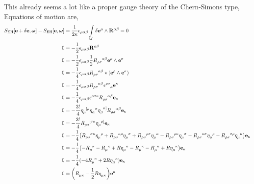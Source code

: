 This already seems a lot like a proper gauge theory of the Chern-Simons type,
Equations of motion are,
\begin{align*}
    S_{\textnormal{EH}}\qty[\vb e+\delta\vb e,\boldsymbol\omega]-S_{\textnormal{EH}}\qty[\vb e,\boldsymbol\omega]&=\frac{1}{2\kappa}\epsilon_{\mu\alpha\beta}\int\limits_M\delta\vb e^{\mu}\wedge\vb R^{\alpha\beta}=0\\
    0&=-\frac12\epsilon_{\mu\alpha\beta}\vb R^{\alpha\beta}\\
    0&=-\frac12\epsilon_{\mu\alpha\beta}\frac12\tensor{R}{_\rho_\sigma^\alpha^\beta}\vb e^\rho\wedge\vb e^\sigma\\
    0&=-\frac14\epsilon_{\mu\alpha\beta}\tensor{R}{_\rho_\sigma^\alpha^\beta}\star\qty(\vb e^\rho\wedge\vb e^\sigma)\\
    0&=-\frac14\epsilon_{\mu\alpha\beta}\tensor{R}{_\rho_\sigma^\alpha^\beta}\tensor{\epsilon}{^\rho^\sigma_\kappa}\vb e^\kappa\\
    0&=-\frac14\epsilon_{\mu\alpha\beta}\tensor{\epsilon}{^\rho^\sigma^\kappa}\tensor{R}{_\rho_\sigma^\alpha^\beta}\vb e_\kappa\\
    0&=-\frac{3!}{4}\tensor{\eta}{_\mu^{[\rho}}\tensor{\eta}{_\alpha^{\sigma}}\tensor{\eta}{_\beta^{\kappa]}}\tensor{R}{_\rho_\sigma^\alpha^\beta}\vb e_\kappa\\
    0&=-\frac{3!}{4}\tensor{R}{_\rho_\sigma^{[\sigma}^\kappa}\tensor{\eta}{_\mu^{\rho]}}\vb e_\kappa\\
    0&=-\frac14\qty(\tensor{R}{_\rho_\sigma^{\sigma}^\kappa}\tensor{\eta}{_\mu^{\rho}}+\tensor{R}{_\rho_\sigma^\kappa^\rho}\tensor{\eta}{_\mu^{\sigma}}+\tensor{R}{_\rho_\sigma^\rho^\sigma}\tensor{\eta}{_\mu^\kappa}-\tensor{R}{_\rho_\sigma^{\rho}^\kappa}\tensor{\eta}{_\mu^{\sigma}}-\tensor{R}{_\rho_\sigma^\kappa^\sigma}\tensor{\eta}{_\mu^{\rho}}-\tensor{R}{_\rho_\sigma^\sigma^\rho}\tensor{\eta}{_\mu^\kappa})\vb e_\kappa\\
    0&=-\frac14\qty(-\tensor{R}{_\mu^\kappa}-\tensor{R}{_\mu^\kappa}+R\tensor{\eta}{_\mu^\kappa}-\tensor{R}{_\mu^\kappa}-\tensor{R}{_\mu^\kappa}+R\tensor{\eta}{_\mu^\kappa})\vb e_\kappa\\
    0&=-\frac14(-4\tensor{R}{_\mu^\kappa}+2R\tensor{\eta}{_\mu^\kappa})\vb e_\kappa\\
    0&=\qty(\tensor{R}{_\mu_\kappa}-\frac12R\tensor{\eta}{_\mu_\kappa})\vb e^\kappa
\end{align*}

